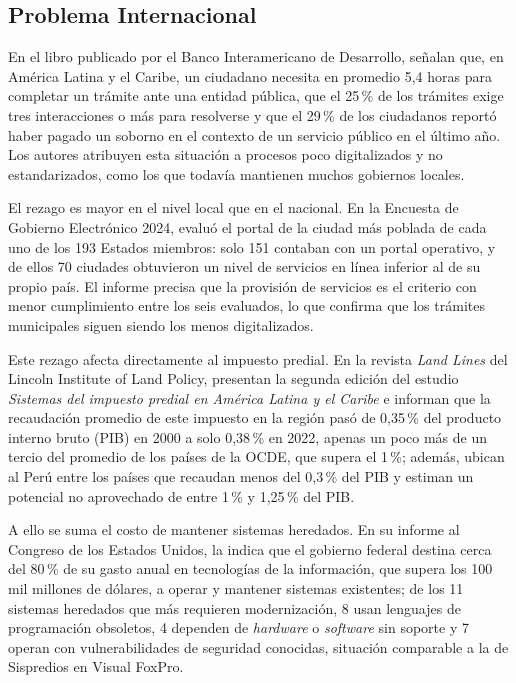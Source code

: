 \documentclass[12pt,a4paper]{report}
\begin{document}
\subsection{Problema Internacional}

En el libro publicado por el Banco Interamericano de Desarrollo, \textcite{bid2018} señalan que, en América Latina y el Caribe, un ciudadano necesita en promedio 5,4 horas para completar un trámite ante una entidad pública, que el 25\,\% de los trámites exige tres interacciones o más para resolverse y que el 29\,\% de los ciudadanos reportó haber pagado un soborno en el contexto de un servicio público en el último año. Los autores atribuyen esta situación a procesos poco digitalizados y no estandarizados, como los que todavía mantienen muchos gobiernos locales.

El rezago es mayor en el nivel local que en el nacional. En la Encuesta de Gobierno Electrónico 2024, \textcite{undesa2024} evaluó el portal de la ciudad más poblada de cada uno de los 193 Estados miembros: solo 151 contaban con un portal operativo, y de ellos 70 ciudades obtuvieron un nivel de servicios en línea inferior al de su propio país. El informe precisa que la provisión de servicios es el criterio con menor cumplimiento entre los seis evaluados, lo que confirma que los trámites municipales siguen siendo los menos digitalizados.

Este rezago afecta directamente al impuesto predial. En la revista \textit{Land Lines} del Lincoln Institute of Land Policy, \textcite{quintanilla2026} presentan la segunda edición del estudio \textit{Sistemas del impuesto predial en América Latina y el Caribe} e informan que la recaudación promedio de este impuesto en la región pasó de 0,35\,\% del producto interno bruto (PIB) en 2000 a solo 0,38\,\% en 2022, apenas un poco más de un tercio del promedio de los países de la OCDE, que supera el 1\,\%; además, ubican al Perú entre los países que recaudan menos del 0,3\,\% del PIB y estiman un potencial no aprovechado de entre 1\,\% y 1,25\,\% del PIB.

A ello se suma el costo de mantener sistemas heredados. En su informe al Congreso de los Estados Unidos, la \textcite{gao2025} indica que el gobierno federal destina cerca del 80\,\% de su gasto anual en tecnologías de la información, que supera los 100 mil millones de dólares, a operar y mantener sistemas existentes; de los 11 sistemas heredados que más requieren modernización, 8 usan lenguajes de programación obsoletos, 4 dependen de \textit{hardware} o \textit{software} sin soporte y 7 operan con vulnerabilidades de seguridad conocidas, situación comparable a la de Sispredios en Visual FoxPro.
\end{document}
